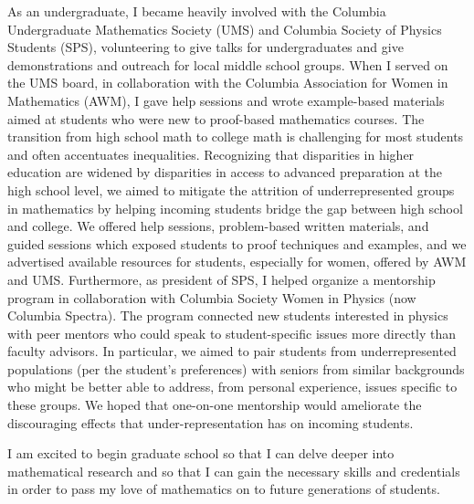 \documentclass[11pt]{article}
\begin{document}
\par
As an undergraduate, I became heavily involved with the Columbia Undergraduate Mathematics Society (UMS) and Columbia Society of Physics Students (SPS), volunteering to give talks for undergraduates and give demonstrations and outreach for local middle school groups. When I served on the UMS board, in collaboration with the Columbia Association for Women in Mathematics (AWM), I gave help sessions and wrote example-based materials aimed at students who were new to proof-based mathematics courses. The transition from high school math to college math is challenging for most students and often accentuates inequalities. Recognizing that disparities in higher education are widened by disparities in access to advanced preparation at the high school level, we aimed to mitigate the attrition of underrepresented groups in mathematics by helping incoming students bridge the gap between high school and college. We offered help sessions, problem-based written materials, and guided sessions which exposed students to proof techniques and examples, and we advertised available resources for students, especially for women, offered by AWM and UMS. Furthermore, as president of SPS, I helped organize a mentorship program in collaboration with Columbia Society Women in Physics (now Columbia Spectra). The program connected new students interested in physics with peer mentors who could speak to student-specific issues more directly than faculty advisors. In particular, we aimed to pair students from underrepresented populations (per the student's preferences) with seniors from similar backgrounds who might be better able to address, from personal experience, issues specific to these groups. We hoped that one-on-one mentorship would ameliorate the discouraging effects that under-representation has on incoming students.
\par 
I am excited to begin graduate school so that I can delve deeper into mathematical research and so that I can gain the necessary skills and credentials in order to pass my love of mathematics on to future generations of students. 
\end{document}
